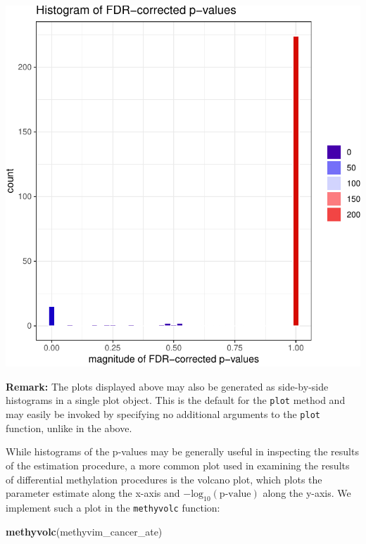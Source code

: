 \documentclass[9pt,a4paper,]{extarticle}
\newenvironment{Shaded}{\begin{snugshade}}{\end{snugshade}}
\newcommand{\KeywordTok}[1]{\textcolor[rgb]{0.13,0.29,0.53}{\textbf{#1}}}
\newcommand{\NormalTok}[1]{#1}
\theoremstyle{definition}
\theoremstyle{definition}
\theoremstyle{definition}
\theoremstyle{remark}
\begin{document}
\begin{center}\includegraphics{paper_BiocF1000_files/figure-latex/methyvim-pvals-fdr-1} \end{center}

\textbf{Remark:} The plots displayed above may also be generated as side-by-side
histograms in a single plot object. This is the default for the \texttt{plot} method
and may easily be invoked by specifying no additional arguments to the \texttt{plot}
function, unlike in the above.

While histograms of the p-values may be generally useful in inspecting the
results of the estimation procedure, a more common plot used in examining the
results of differential methylation procedures is the volcano plot, which plots
the parameter estimate along the x-axis and \(-\text{log}_{10}(\text{p-value})\)
along the y-axis. We implement such a plot in the \texttt{methyvolc} function:

\begin{Shaded}
\begin{Highlighting}[]
\KeywordTok{methyvolc}\NormalTok{(methyvim_cancer_ate)}
\end{Highlighting}
\end{Shaded}
\end{document}
